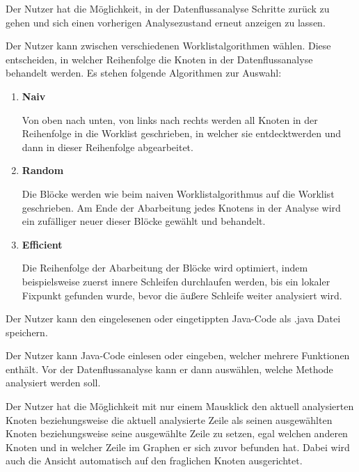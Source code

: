 Der Nutzer hat die Möglichkeit, in der Datenflussanalyse Schritte zurück zu gehen
und sich einen vorherigen Analysezustand erneut anzeigen zu lassen.

Der Nutzer kann zwischen verschiedenen Worklistalgorithmen wählen. Diese
entscheiden, in welcher Reihenfolge die Knoten in der Datenflussanalyse behandelt
werden. Es stehen folgende Algorithmen zur Auswahl:
\begin{enumerate}[label=(\alph*)]
\item \textbf{Naiv} \par
Von oben nach unten, von links nach rechts werden all Knoten in der Reihenfolge in
die Worklist geschrieben, in welcher sie \glqq entdeckt\grqq werden und dann in dieser Reihenfolge abgearbeitet.
\item \textbf{Random} \par
Die Blöcke werden wie beim naiven Worklistalgorithmus auf die Worklist geschrieben. Am Ende der Abarbeitung jedes Knotens in der Analyse wird ein
zufälliger neuer dieser Blöcke gewählt und behandelt.
\item \textbf{Efficient} \par
Die Reihenfolge der Abarbeitung der Blöcke wird optimiert, indem beispielsweise
zuerst innere Schleifen durchlaufen werden, bis ein lokaler Fixpunkt gefunden wurde, bevor die äußere Schleife weiter analysiert wird.
\end{enumerate}

Der Nutzer kann den eingelesenen oder eingetippten Java-Code als .java Datei
speichern.

Der Nutzer kann Java-Code einlesen oder eingeben, welcher mehrere Funktionen
enthält. Vor der Datenflussanalyse kann er dann auswählen, welche Methode
analysiert werden soll.

Der Nutzer hat die Möglichkeit mit nur einem Mausklick den aktuell analysierten
Knoten beziehungsweise die aktuell analysierte Zeile als seinen ausgewählten Knoten beziehungsweise seine ausgewählte Zeile zu setzen, egal welchen anderen Knoten und in welcher Zeile im Graphen er sich zuvor befunden hat. Dabei wird auch die Ansicht automatisch auf den fraglichen Knoten ausgerichtet.

